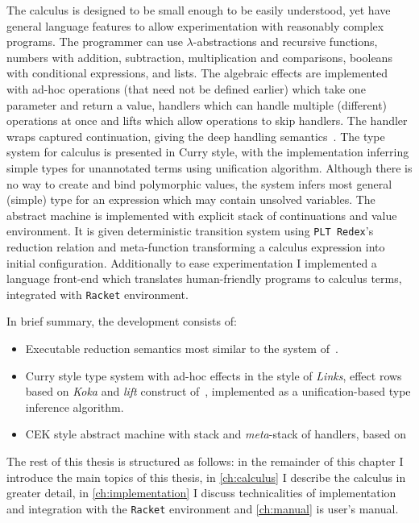 \documentclass[inz, english, longabstract]{iithesis}
\newcommand{\Redex}{\texttt{PLT Redex}}
\newcommand{\Racket}{\texttt{Racket}}
\begin{document}
The calculus is designed to be small enough to be easily understood, yet have general language features to allow experimentation with reasonably complex programs.
The programmer can use $\lambda$-abstractions and recursive functions, numbers with addition, subtraction, multiplication and comparisons, booleans with conditional expressions, and lists.
The algebraic effects are implemented with ad-hoc operations (that need not be defined earlier) which take one parameter and return a value, handlers which can handle multiple (different) operations at once and lifts which allow operations to skip handlers.
The handler wraps captured continuation, giving the deep handling semantics~\cite{Leijen2014}.
The type system for calculus is presented in Curry style, with the implementation inferring simple types for unannotated terms using unification algorithm.
Although there is no way to create and bind polymorphic values, the system infers most general (simple) type for an expression which may contain unsolved variables.
The abstract machine is implemented with explicit stack of continuations and value environment.
It is given deterministic transition system using \Redex{}'s reduction relation and meta-function transforming a calculus expression into initial configuration.
Additionally to ease experimentation I implemented a language front-end which translates human-friendly programs to calculus terms, integrated with \Racket{} environment.

In brief summary, the development consists of:
\begin{itemize}
  \item Executable reduction semantics most similar to the system of~\cite{Biernacki2017}.
  \item Curry style type system with ad-hoc effects in the style of \emph{Links}, effect rows based on \emph{Koka} and \emph{lift} construct of~\cite{Biernacki2017}, implemented as a unification-based type inference algorithm.
  \item CEK style abstract machine with stack and \emph{meta}-stack of handlers, based on~\cite{Hillerstrom2016}
\end{itemize}

The rest of this thesis is structured as follows: in the remainder of this chapter I introduce the main topics of this thesis, in \autoref{ch:calculus} I describe the calculus in greater detail, in \autoref{ch:implementation} I discuss technicalities of implementation and integration with the \Racket{} environment and \autoref{ch:manual} is user's manual.
\end{document}
